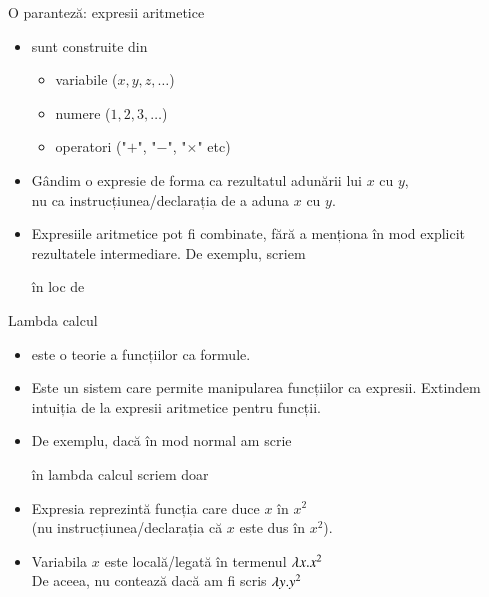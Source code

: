 \documentclass[xcolor=pdftex,romanian,colorlinks]{beamer}
\begin{document}
\begin{frame}{O paranteză: expresii aritmetice}

\begin{itemize}
\item {} sunt construite din
\begin{itemize}
	\item variabile ($x, y, z, \ldots$)
	\item numere ($1, 2, 3, \ldots$)
	\item operatori ("$+$", "$-$", "$\times$" etc)
\end{itemize}

\medskip
\item Gândim o expresie de forma  ca \alert{rezultatul} adunării lui $x$ cu $y$, \\ nu ca instrucțiunea/declarația de a aduna $x$ cu $y$.

\medskip
\item Expresiile aritmetice pot fi combinate, fără a menționa în mod explicit rezultatele intermediare. De exemplu, scriem
\begin{center}
\end{center}
în loc de
\begin{center}
\end{center}
\end{itemize}
\end{frame}

\begin{frame}{Lambda calcul}

\begin{itemize}
\item {} este o teorie a \alert{funcțiilor ca formule}.
\medskip
\item Este un sistem care permite manipularea funcțiilor ca \alert{expresii}. Extindem intuiția de la expresii aritmetice pentru funcții. 
\medskip
\item De exemplu, dacă în mod normal am scrie

\begin{center}
\end{center}

 în lambda calcul scriem doar

 \begin{center}
 \end{center}

\medskip
\item Expresia  \alert{reprezintă} funcția care duce $x$ în $x^2$ \\(nu instrucțiunea/declarația că $x$ este dus în $x^2$).
\medskip
\item Variabila $x$ este \alert{locală/legată} în termenul $\lambda x.x^2$ \\De aceea, nu contează dacă am fi scris $\lambda y.y^2$
\end{itemize}
\end{frame}
\end{document}
